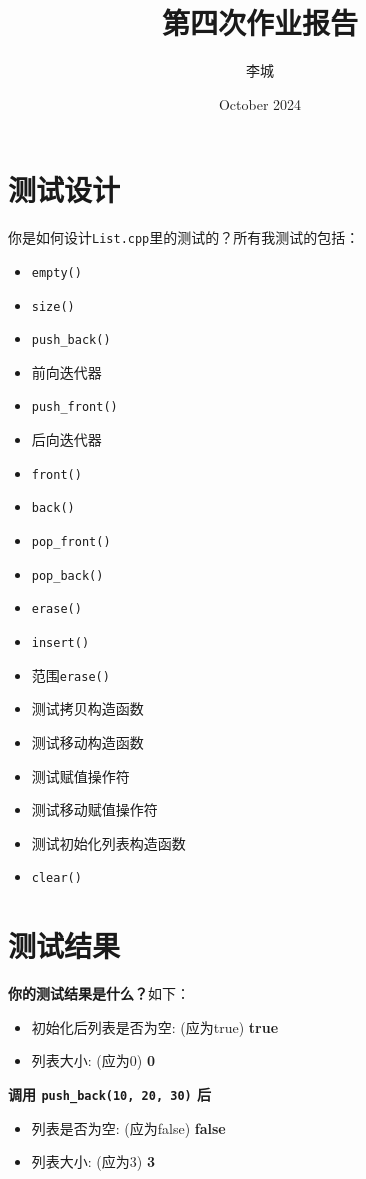 \documentclass{article}
\title{第四次作业报告}
\author{李城}
\date{October 2024}
\begin{document}
\section*{测试设计}  
你是如何设计\texttt{List.cpp}里的测试的？所有我测试的包括：  
\begin{itemize}  
    \item \texttt{empty()}  
    \item \texttt{size()}  
    \item \texttt{push\_back()}  
    \item 前向迭代器  
    \item \texttt{push\_front()}  
    \item 后向迭代器  
    \item \texttt{front()}  
    \item \texttt{back()}  
    \item \texttt{pop\_front()}  
    \item \texttt{pop\_back()}  
    \item \texttt{erase()}  
    \item \texttt{insert()}  
    \item 范围\texttt{erase()}  
    \item 测试拷贝构造函数  
    \item 测试移动构造函数  
    \item 测试赋值操作符  
    \item 测试移动赋值操作符  
    \item 测试初始化列表构造函数  
    \item \texttt{clear()}  
\end{itemize}  
  
\section*{测试结果}  
\textbf{你的测试结果是什么？}如下：  
\begin{itemize}  
    \item 初始化后列表是否为空: (应为true) \textbf{true}  
    \item 列表大小: (应为0) \textbf{0}  
\end{itemize}  
  
\textbf{调用 \texttt{push\_back(10, 20, 30)} 后}  
\begin{itemize}  
    \item 列表是否为空: (应为false) \textbf{false}  
    \item 列表大小: (应为3) \textbf{3}  
\end{itemize}  
  
\end{document}
